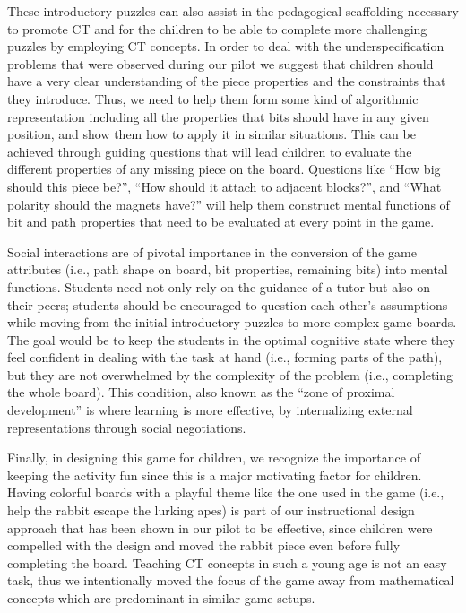 \documentclass{acm_proc_article-sp}
\begin{document}
These introductory puzzles can also assist in the pedagogical scaffolding necessary to promote CT and for the children to be able to complete more challenging puzzles by employing CT concepts. 
In order to deal with the underspecification problems that were observed during our pilot we suggest that children should have a very clear understanding of the piece properties and the constraints that they introduce. 
Thus, we need to help them form some kind of algorithmic representation including all the properties that bits should have in any given position, and show them how to apply it in similar situations. 
This can be achieved through guiding questions that will lead children to evaluate the different properties of any missing piece on the board. 
Questions like ``How big should this piece be?'', ``How should it attach to adjacent blocks?'', and ``What polarity should the magnets have?'' will help them construct mental functions of bit and path properties that need to be evaluated at every point in the game.

Social interactions are of pivotal importance in the conversion of the game attributes (i.e., path shape on board, bit properties, remaining bits) into mental functions. 
Students need not only rely on the guidance of a tutor but also on their peers; students should be encouraged to question each other's assumptions while moving from the initial introductory puzzles to more complex game boards. 
The goal would be to keep the students in the optimal cognitive state where they feel confident in dealing with the task at hand (i.e., forming parts of the path), but they are not overwhelmed by the complexity of the problem (i.e., completing the whole board). 
This condition, also known as the ``zone of proximal development'' \cite{vygotsky1987zone} is where learning is more effective, by internalizing external representations through social negotiations.

Finally, in designing this game for children, we recognize the importance of keeping the activity fun since this is a major motivating factor for children. 
Having colorful boards with a playful theme like the one used in the game (i.e., help the rabbit escape the lurking apes) is part of our instructional design approach that has been shown in our pilot to be effective, since children were compelled with the design and moved the rabbit piece even before fully completing the board. 
Teaching CT concepts in such a young age is not an easy task, thus we intentionally moved the focus of the game away from mathematical concepts which are predominant in similar game setups.
\end{document}
